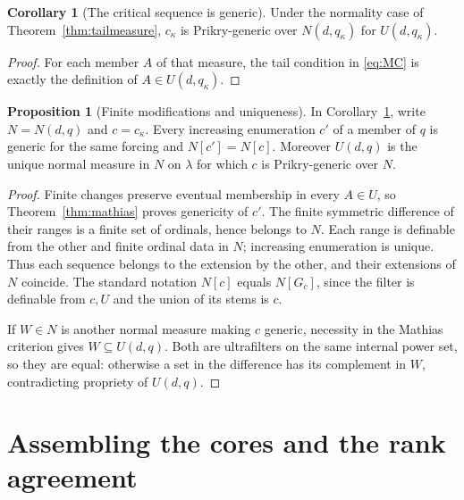 \documentclass[11pt,letterpaper]{article}
\theoremstyle{definition}
\newtheorem{proposition}[definition]{Proposition}
\newtheorem{corollary}[definition]{Corollary}
\begin{document}
\begin{corollary}[The critical sequence is generic]\label{cor:generic}
Under the normality case of Theorem~\ref{thm:tailmeasure}, $c_\kappa$ is Prikry-generic over $N(d,q_\kappa)$ for $U(d,q_\kappa)$.
\end{corollary}

\begin{proof}
For each member $A$ of that measure, the tail condition in \eqref{eq:MC} is exactly the definition of $A\in U(d,q_\kappa)$.
\end{proof}

\begin{proposition}[Finite modifications and uniqueness]\label{prop:finitegeneric}
In Corollary~\ref{cor:generic}, write $N=N(d,q)$ and $c=c_\kappa$.
Every increasing enumeration $c'$ of a member of $q$ is generic for the same forcing and $N[c']=N[c]$. Moreover $U(d,q)$ is the unique normal measure in $N$ on $\lambda$ for which $c$ is Prikry-generic over $N$.
\end{proposition}

\begin{proof}
Finite changes preserve eventual membership in every $A\in U$, so Theorem~\ref{thm:mathias} proves genericity of $c'$. The finite symmetric difference of their ranges is a finite set of ordinals, hence belongs to $N$. Each range is definable from the other and finite ordinal data in $N$; increasing enumeration is unique. Thus each sequence belongs to the extension by the other, and their extensions of $N$ coincide. The standard notation $N[c]$ equals $N[G_c]$, since the filter is definable from $c,U$ and the union of its stems is $c$.

If $W\in N$ is another normal measure making $c$ generic, necessity in the Mathias criterion gives $W\subseteq U(d,q)$. Both are ultrafilters on the same internal power set, so they are equal: otherwise a set in the difference has its complement in $W$, contradicting propriety of $U(d,q)$.
\end{proof}

\section{Assembling the cores and the rank agreement}\label{sec:assembly}
\end{document}
